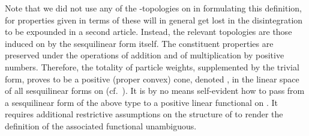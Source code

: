 \documentclass[a4paper,a4paper]{article}
\numberwithin{equation}{section}
\providecommand{\Wecm}{\mathecm{W}}
\providecommand{\Cfrak}{\mathfrak{C}}
\providecommand{\Lfrak}{\mathfrak{L}}
\theoremstyle{definition}
\theoremstyle{plain}
\theoremstyle{remark}
\providecommand{\qD}{q_\Delta}
\begin{document}
  Note that we did not use any of the \myHighlight{$\qD$}\coordHE{}-topologies on \myHighlight{$\Lfrak$}\coordHE{} in
  formulating this definition, for properties given in terms of these
  will in general get lost in the disintegration to be expounded in a
  second article. Instead, the relevant topologies are those induced
  on \myHighlight{$\Lfrak$}\coordHE{} by the sesquilinear form itself. The constituent
  properties are preserved under the operations of addition and of
  multiplication by positive numbers. Therefore, the totality of
  particle weights, supplemented by the trivial form, proves to be a
  positive (proper convex) cone, denoted \myHighlight{$\Wecm$}\coordHE{}, in the linear space
  of all sesquilinear forms on \myHighlight{$\Lfrak$}\coordHE{}
  (cf.~\cite{peressini:1967,asimow/ellis:1980}). It is by no means
  self-evident how to pass from a sesquilinear form of the above type
  to a positive linear functional on \myHighlight{$\Cfrak$}\coordHE{}. It requires additional
  restrictive assumptions on the structure of \myHighlight{$\Cfrak$}\coordHE{} to render the
  definition of the associated functional unambiguous.
    
\end{document}
